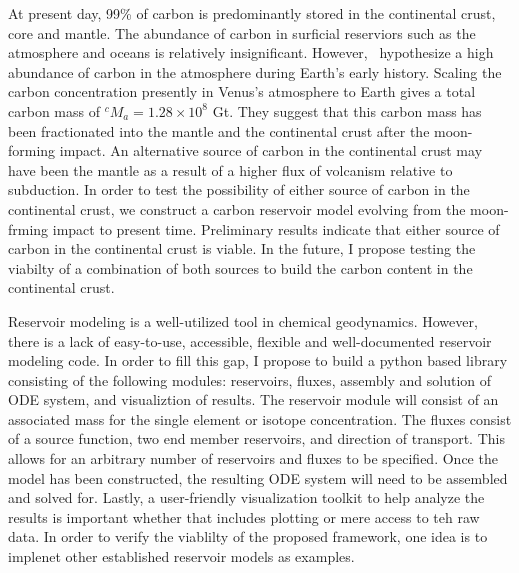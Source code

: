 At present day, 99\% of carbon is predominantly stored in the continental crust, core and mantle. The abundance of carbon in surficial reserviors such as the atmosphere and oceans is relatively insignificant. However,~\citet{SNH-ZK:2001} hypothesize a high abundance of carbon in the atmosphere during Earth's early history. Scaling the carbon concentration presently in Venus's atmosphere to Earth gives a total carbon mass of $^cM_{a} = 1.28 \times 10^8$ Gt. They suggest that this carbon mass has been fractionated into the mantle and the continental crust after the moon-forming impact. An alternative source of carbon in the continental crust may have been the mantle as a result of a higher flux of volcanism relative to subduction. In order to test the possibility of either source of carbon in the continental crust, we construct a carbon reservoir model evolving from the moon-frming impact to present time. Preliminary results indicate that either source of carbon in the continental crust is viable. In the future, I propose testing the viabilty of a combination of both sources to build the carbon content in the continental crust.

Reservoir modeling is a well-utilized tool in chemical geodynamics. However, there is a lack of easy-to-use, accessible, flexible and well-documented reservoir modeling code. In order to fill this gap, I propose to build a python based library consisting of the following modules: reservoirs, fluxes, assembly and solution of ODE system, and visualiztion of results. The reservoir module will consist of an associated mass for the single element or isotope concentration. The fluxes consist of a source function, two end member reservoirs, and direction of transport. This allows for an arbitrary number of reservoirs and fluxes to be specified. Once the model has been constructed, the resulting ODE system will need to be assembled and solved for. Lastly, a user-friendly visualization toolkit to help analyze the results is important whether that includes plotting or mere access to teh raw data. In order to verify the viablilty of the proposed framework, one idea is to implenet other established reservoir models as examples.
